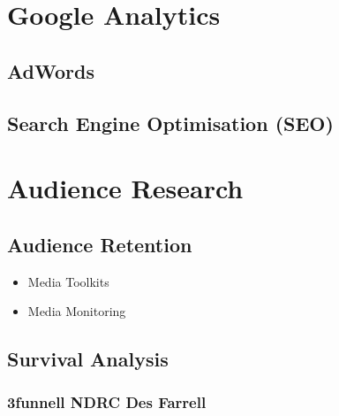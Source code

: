 \section{Google Analytics}
\subsection{AdWords}
\subsection{Search Engine Optimisation (SEO)}
\section{Audience Research}
\subsection{Audience Retention}
\begin{itemize}
\item Media Toolkits
\item Media Monitoring
\end{itemize}
\subsection{Survival Analysis}
\subsubsection{3funnell NDRC Des Farrell}
